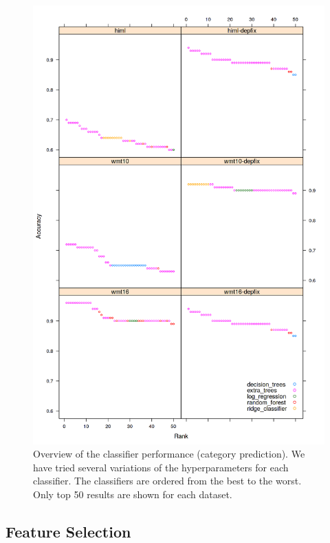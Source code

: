 \begin{figure}
\centering
  \includegraphics[scale=0.7]{cats-class}
  \caption{
    Overview of the classifier performance (category prediction).
We have tried several variations of the hyperparameters
for each classifier. The classifiers are ordered from the best to the worst. Only top 50 results
are shown for each dataset.
}
  \label{cats-draft}
\end{figure}

\subsection{Feature Selection}

